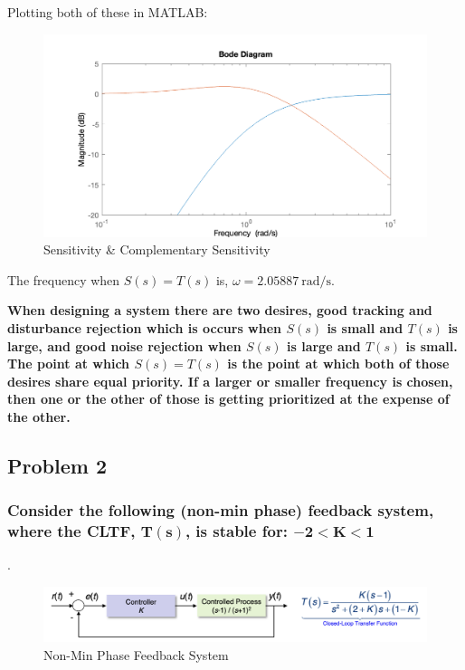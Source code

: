\documentclass[12pt, letterpaper]{../assignment}
\begin{document}
Plotting both of these in MATLAB:
\begin{figure}[H]
    \centering
    \includegraphics[width=1\linewidth]{./figures/Q2_Bode_Mag.png}
    \caption{Sensitivity \& Complementary Sensitivity}
\end{figure}

\begin{answer}
The frequency when $S(s) = T(s)$ is, $\omega = 2.05887 \ \text{rad/s}$.
\end{answer}

\begin{answer} \textbf{
When designing a system there are two desires,
good tracking and disturbance rejection which is occurs when $S(s)$ is small and $T(s)$ is large,
and good noise rejection when $S(s)$ is large and $T(s)$ is small.
The point at which $S(s) = T(s)$ is the point at which both of those desires share equal priority.
If a larger or smaller frequency is chosen,
then one or the other of those is getting prioritized at the expense of the other.}
\end{answer}

\subsection*{Problem 2}
\subsubsection*{Consider the following (non-min phase) feedback system,
where the CLTF, $\mathbf{T(s)}$, is stable for: $\mathbf{-2<K<1}$}.
\begin{figure}[H]
    \centering
    \includegraphics[width=1\linewidth]{./figures/Q3_Block_Diagram.png}
    \caption{ Non-Min Phase Feedback System}
\end{figure}
\end{document}
